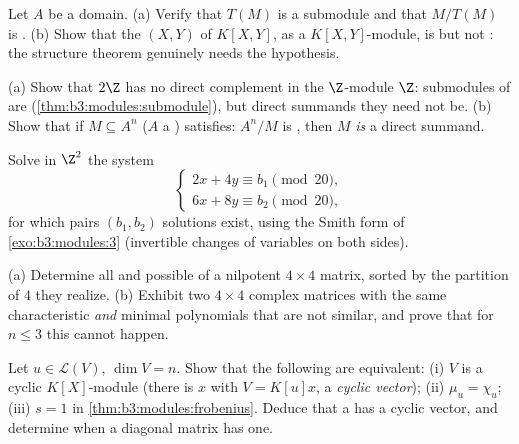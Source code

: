 \begin{exercise}[$\star\star$]\label{exo:b3:modules:5}
Let $A$ be a domain. (a) Verify that $T(M)$ is a submodule and
that $M/T(M)$ is . (b) Show that the  $(X, Y)$
of $K[X,Y]$, as a $K[X,Y]$-module, is  but not :
the structure theorem genuinely needs the  hypothesis.
\end{exercise}

\begin{exercise}[$\star\star$]\label{exo:b3:modules:6}
(a) Show that $2\Z$ has no direct complement in the $\Z$-module
$\Z$: submodules of  are 
(\cref{thm:b3:modules:submodule}), but direct summands they need
not be. (b) Show that if $M \subseteq A^n$ ($A$ a ) satisfies:
$A^n/M$ is , then $M$ \emph{is} a direct summand.
\end{exercise}

\begin{exercise}[$\star\star$]\label{exo:b3:modules:7}
Solve in $\Z^2$ the system
\[
\begin{cases}
2x + 4y \equiv b_1 \pmod{20},\\
6x + 8y \equiv b_2 \pmod{20},
\end{cases}
\]
for which pairs $(b_1, b_2)$ solutions exist, using the Smith
form of \cref{exo:b3:modules:3} (invertible changes of variables
on both sides).
\end{exercise}

\begin{exercise}[$\star\star$]\label{exo:b3:modules:8}
(a) Determine all  and possible 
of a nilpotent $4 \times 4$ matrix, sorted by the partition of
$4$ they realize.
(b) Exhibit two $4\times4$ complex matrices with the same
characteristic \emph{and} minimal polynomials that are not
similar, and prove that for $n \leq 3$ this cannot happen.
\end{exercise}

\begin{exercise}[$\star\star\star$]\label{exo:b3:modules:9}
Let $u \in \mathcal L(V)$, $\dim V = n$. Show that the following
are equivalent: (i) $V$ is a cyclic $K[X]$-module (there is $x$
with $V = K[u]x$, a \emph{cyclic vector}); (ii) $\mu_u = \chi_u$;
(iii) $s = 1$ in \cref{thm:b3:modules:frobenius}. Deduce that a
 has a cyclic vector, and determine when a
diagonal matrix has one.
\end{exercise}

